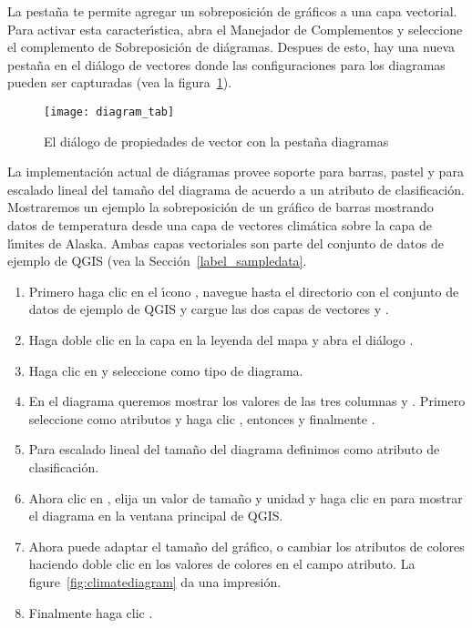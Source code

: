 La pesta\~na  te permite agregar un sobreposici\'on de gr\'aficos a una capa vectorial.
Para activar esta caracter\'{\i}stica, abra el Manejador de Complementos y seleccione el complemento  
de Sobreposici\'on de di\'agramas. Despues de esto, hay una nueva pesta\~na en el di\'alogo de vectores  donde las configuraciones para los diagramas pueden ser capturadas (vea 
la figura~\ref{fig:diagramtab}).

\begin{figure}[ht]
   \begin{center}
   \caption{El di\'alogo de propiedades de vector con la pesta\~na diagramas \nixcaption}\label{fig:diagramtab}\smallskip
   \texttt{[image: diagram\_tab]}
\end{center}
\end{figure}

La implementaci\'on actual de di\'agramas provee soporte para barras, pastel
y para escalado lineal del tama\~no del diagrama de acuerdo a un atributo de
clasificaci\'on. Mostraremos un ejemplo la sobreposici\'on de un gr\'afico de barras
mostrando datos de temperatura desde una capa de vectores clim\'atica sobre la capa de l\'{\i}mites de Alaska.
Ambas capas vectoriales son parte del conjunto de datos de ejemplo de QGIS (vea
la Secci\'on~\ref{label_sampledata}.

\begin{enumerate}
\item Primero haga clic en el \'{\i}cono ,
navegue hasta el directorio con el conjunto de datos de ejemplo de QGIS y cargue las dos capas de vectores
 y .
\item Haga doble clic en la capa  en la leyenda del mapa y abra el di\'alogo
.
\item Haga clic en  y seleccione  como
tipo de diagrama.
\item En el diagrama queremos mostrar los valores de las tres columnas
 y . Primero seleccione
 como atributos y haga clic , entonces
 y finalmente .  
\item Para escalado lineal del tama\~no del diagrama definimos 
como atributo de clasificaci\'on.
\item Ahora clic en , elija un valor de tama\~no y unidad y haga clic
en  para mostrar el diagrama en la ventana principal de QGIS.
\item Ahora puede adaptar el tama\~no del gr\'afico, o cambiar los atributos de colores haciendo
doble clic en los valores de colores en el campo atributo. La
figure~\ref{fig:climatediagram} da una impresi\'on.
\item Finalmente haga clic . 
\end{enumerate}

